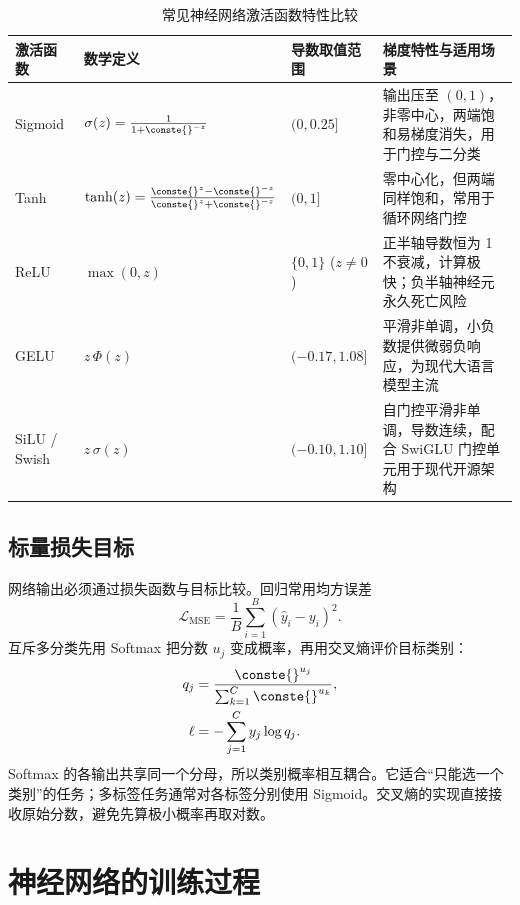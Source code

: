 \documentclass[../textbook.tex]{subfiles}
\begin{document}
\begin{table}[htbp]
\centering
\caption{常见神经网络激活函数特性比较}\label{tab:activation-functions}
\begin{tabularx}{\linewidth}{p{20mm}p{34mm}p{22mm}X}
\toprule
激活函数 & 数学定义 & 导数取值范围 & 梯度特性与适用场景 \\\midrule
Sigmoid & $\sigma(z)=\frac{1}{1+\conste{}^{-z}}$ & $(0, 0.25]$ & 输出压至 $(0,1)$，非零中心，两端饱和易梯度消失，用于门控与二分类 \\
Tanh & $\tanh(z)=\frac{\conste{}^z-\conste{}^{-z}}{\conste{}^z+\conste{}^{-z}}$ & $(0, 1]$ & 零中心化，但两端同样饱和，常用于循环网络门控 \\
ReLU & $\max(0,z)$ & $\{0, 1\}$ ($z\neq 0$) & 正半轴导数恒为 1 不衰减，计算极快；负半轴神经元永久死亡风险 \\
GELU & $z\,\Phi(z)$ & $(-0.17, 1.08]$ & 平滑非单调，小负数提供微弱负响应，为现代大语言模型主流 \\
SiLU / Swish & $z\,\sigma(z)$ & $(-0.10, 1.10]$ & 自门控平滑非单调，导数连续，配合 SwiGLU 门控单元用于现代开源架构 \\
\bottomrule
\end{tabularx}
\end{table}

\subsection{标量损失目标}
网络输出必须通过损失函数与目标比较。回归常用均方误差
\begin{equation}
 \mathcal L_{\mathrm{MSE}}=\frac{1}{B}\sum_{i=1}^{B}(\hat y_i-y_i)^2.
\end{equation}
互斥多分类先用 Softmax 把分数 $u_j$ 变成概率，再用交叉熵评价目标类别：
\begin{equation}
\begin{aligned}
 q_j &= \frac{\conste{}^{u_j}}{\sum_{k=1}^{C}\conste{}^{u_k}}, \\
 \ell &= -\sum_{j=1}^{C}y_j\log q_j.
\end{aligned}
\end{equation}
Softmax 的各输出共享同一个分母，所以类别概率相互耦合。它适合“只能选一个类别”的任务；多标签任务通常对各标签分别使用 Sigmoid。交叉熵的实现直接接收原始分数，避免先算极小概率再取对数。

\section{神经网络的训练过程}
\end{document}

